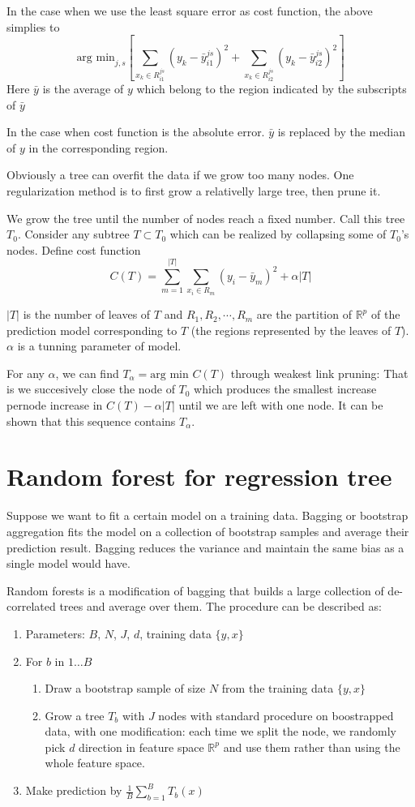 \documentclass{article}
\begin{document}
In the case when we use the least square error as cost function, the above simplies to
\[
\textrm{arg min}_{j,s}[\sum_{x_k\in R_{i1}^{js}}(y_k-\bar{y}_{i1}^{js})^2+\sum_{x_k\in R_{i2}^{js}}(y_k-\bar{y}_{i2}^{js})^2]\nonumber
\]
Here $\bar{y}$ is the average of $y$ which belong to the region indicated by the subscripts of $\bar{y}$

In the case when cost function is the absolute error. $\bar{y}$ is replaced by the median of $y$ in the corresponding region.

Obviously a tree can overfit the data if we grow too many nodes. One regularization method is to first grow a relativelly large tree, then prune it. 

We grow the tree until the number of nodes reach a fixed number. Call this tree $T_0$. Consider any subtree $T \subset T_0$ which can be realized by collapsing some of $T_0$'s nodes. Define cost function
\[
C(T)=\sum_{m=1}^{|T|}\sum_{x_i\in R_m}(y_i-\bar{y}_m)^2+\alpha|T|
\]

$|T|$ is the number of leaves of $T$ and $R_1, R_2,\cdots, R_m$ are the partition of $\mathbb{R}^p$ of the prediction model corresponding to $T$ (the regions represented by the leaves of $T$). $\alpha$ is a tunning parameter of model. 

For any $\alpha$, we can find $T_\alpha=\textrm{arg min }C(T)$ through weakest link pruning: That is we succesively close the node of $T_0$ which produces the smallest increase pernode increase in $C(T)-\alpha|T|$ until we are left with one node. It can be shown that this sequence contains $T_\alpha$.
\section{Random forest for regression tree}
Suppose we want to fit a certain model on a training data. Bagging or bootstrap aggregation fits the model on a collection of bootstrap samples and average their prediction result. Bagging reduces the variance and maintain the same bias as a single model would have.

Random forests is a modification of bagging that builds a large collection of de-correlated trees and average over them. The procedure can be described as:

\begin{enumerate}
\item
Parameters: $B$, $N$, $J$, $d$, training data $\{y,x\}$
\item
For $b$ in $1\dots B$
\begin{enumerate}
\item
Draw a bootstrap sample of size $N$ from the training data $\{y,x\}$
\item
Grow a tree $T_b$ with $J$ nodes with standard procedure on boostrapped data, with one modification: each time we split the node, we randomly pick $d$ direction in feature space $\mathbb{R}^p$ and use them rather than using the whole feature space. 
\end{enumerate}
\item
Make prediction by $\frac{1}{B}\sum_{b=1}^BT_b(x)$
\end{enumerate}
\end{document}
